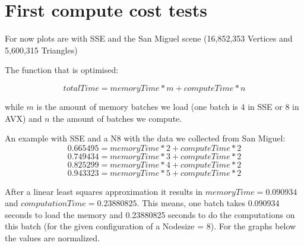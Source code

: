 
\section{First compute cost tests}

For now plots are with SSE and the San Miguel scene (16,852,353 Vertices and 5,600,315 Triangles) 

The function that is optimised: 

\[totalTime = memoryTime * m + computeTime * n \]

while $m$ is the amount of memory batches we load (one batch is 4 in SSE or 8 in AVX) and $n$ the amount of batches we compute.

An example with SSE and a N8 with the data we collected from San Miguel:
\[0.665495 = memoryTime * 2 + computeTime * 2 \]
\[0.749434 = memoryTime * 3 + computeTime * 2 \]
\[0.825299 = memoryTime * 4 + computeTime * 2 \]
\[0.943323 = memoryTime * 5 + computeTime * 2 \]

After a linear least squares approximation it results in $memoryTime = 0.090934$  and $computationTime = 0.23880825$. This means, one batch takes 0.090934 seconds to load the memory and  0.23880825 seconds to do the computations on this batch (for the given configuration of a Nodesize = 8). For the graphs below the values are normalized.


\begin{minipage}[t]{0.8\textwidth}
\end{minipage}

\begin{minipage}[t]{0.8\textwidth}
\end{minipage}